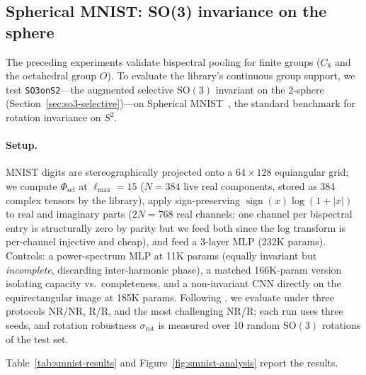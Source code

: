 \documentclass{article}
\theoremstyle{definition}
\theoremstyle{remark}
\newcommand{\SO}{\mathrm{SO}}
\theoremstyle{definition}
\begin{document}
\subsection{Spherical MNIST: SO(3) invariance on the sphere}
\label{sec:smnist}

The preceding experiments validate bispectral pooling for finite groups
($C_8$ and the octahedral group $O$). To evaluate the library's continuous
group support, we test \texttt{SO3onS2}---the augmented selective
$\SO(3)$ invariant on the 2-sphere
(Section~\ref{sec:so3-selective})---on Spherical
MNIST~\citep{cohen2018spherical}, the standard benchmark for
rotation invariance on $S^2$.

\paragraph{Setup.}
MNIST digits are stereographically projected onto a
$64\times 128$ equiangular grid; we compute
$\Phi_{\mathrm{sel}}$ at $\ell_{\max}=15$ ($N=384$ live real
components, stored as 384 complex tensors by the library), apply
sign-preserving $\operatorname{sign}(x)\log(1+|x|)$ to real and
imaginary parts ($2N=768$ real channels; one channel per
bispectral entry is structurally zero by parity but we feed both
since the log transform is per-channel injective and cheap), and
feed a 3-layer MLP (232K params). Controls: a power-spectrum MLP at 11K
params (equally invariant but \emph{incomplete}, discarding
inter-harmonic phase), a matched 166K-param version isolating
capacity vs.\ completeness, and a non-invariant CNN directly on the
equirectangular image at 185K params.
Following \citet{cohen2018spherical}, we evaluate under three
protocols NR/NR, R/R, and the most challenging NR/R; each run uses
three seeds, and rotation robustness $\sigma_{\mathrm{rot}}$ is
measured over 10 random $\SO(3)$ rotations of the test set.

Table~\ref{tab:smnist-results} and
Figure~\ref{fig:smnist-analysis} report the results.
\end{document}
